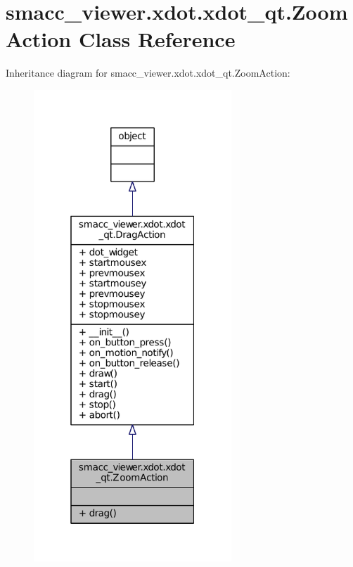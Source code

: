 \hypertarget{classsmacc__viewer_1_1xdot_1_1xdot__qt_1_1ZoomAction}{}\section{smacc\+\_\+viewer.\+xdot.\+xdot\+\_\+qt.\+Zoom\+Action Class Reference}
\label{classsmacc__viewer_1_1xdot_1_1xdot__qt_1_1ZoomAction}


Inheritance diagram for smacc\+\_\+viewer.\+xdot.\+xdot\+\_\+qt.\+Zoom\+Action\+:
\nopagebreak
\begin{figure}[H]
\begin{center}
\leavevmode
\includegraphics[width=211pt]{classsmacc__viewer_1_1xdot_1_1xdot__qt_1_1ZoomAction__inherit__graph}
\end{center}
\end{figure}


